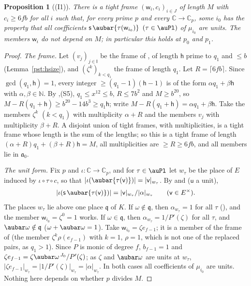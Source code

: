 \documentclass[10pt]{amsart}
\newtheorem{proposition}[theorem]{Proposition}
\theoremstyle{definition}
\theoremstyle{remark}
\newcommand{\C}{\mathbb C}
\newcommand{\N}{\mathbb N}
\begin{document}
\begin{proposition}[(I1)]\label{pst:I1}
There is a tight frame $(\mathsf w_i,c_i)_{i\in J}$ of length $M$ with $c_i\ge6fb$ for all $i$ such
that, for every prime $p$ and every $\C\to\C_p$, some $i_0$ has the property that all coefficients
$\mathsf s\,\aubar{\tau(\mathsf w_{i_0})}$ $(\tau\in\auPl)$ of $\mu_{i_0}$ are units. The members
$\mathsf w_i$ do not depend on $M$; in particular this holds at $p_0$ and $p_1$.
\end{proposition}
\begin{proof}
\emph{The frame.} Let $(v_j)_{j\in\mathsf I}$ be the frame of {\cite[Lemma~7.11]{P49}}, of length
$\mathsf h$ prime to $q_1$ and $\le b$ (Lemma~\ref{pst:hsize}), and $(\zeta^k)_{k<q_1}$ the frame of
length $q_1$. Let $R=\lceil6fb\rceil$. Since $\gcd(q_1,\mathsf h)=1$, every integer
$\ge(q_1-1)(\mathsf h-1)$ is of the form $\alpha q_1+\beta\mathsf h$ with $\alpha,\beta\in\N$.
By {\cite[Lemma~13.4(S3)]{P46}},(S5), $q_1\le x^{12}\le b$, $R\le7b^2$ and $M\ge b^{20}$, so
$M-R(q_1+\mathsf h)\ge b^{20}-14b^3\ge q_1\mathsf h$; write $M-R(q_1+\mathsf h)=\alpha q_1+\beta
\mathsf h$. Take the members $\zeta^k$ $(k<q_1)$ with multiplicity $\alpha+R$ and the members $v_j$
with multiplicity $\beta+R$. A disjoint union of tight frames, with multiplicities, is a tight frame
whose length is the sum of the lengths; so this is a tight frame of length $(\alpha+R)q_1+(\beta+R)
\mathsf h=M$, all multiplicities are $\ge R\ge6fb$, and all members lie in $\mathfrak a_0$.

\emph{The unit form.} Fix $p$ and $\iota\colon\C\to\C_p$, and for $\tau\in\auPl$ let $w_\tau$ be
the place of $E$ induced by $\iota\circ\tau\circ c$, so that $|\iota(\aubar{\tau(\mathsf v)})|=|\mathsf
v|_{w_\tau}$. By {\cite[Lemma~7.12]{P49}} and {\cite[Corollary~7.3]{P49}} ($\mathsf u$ a unit),
\[
|\iota(\mathsf s\,\aubar{\tau(\mathsf v)})|=|\mathsf v|_{w_\tau}/|\alpha|_{w_\tau}\qquad(\mathsf v
\in E^\times).
\]
The places $w_\tau$ lie above one place $\mathfrak q$ of $K$. If $\omega\notin\mathfrak q$, then
$\alpha_{w_\tau}=1$ for all $\tau$ ({\cite[\S5.2.1]{P49}}), and the member $\mathsf w_{i_0}=\zeta^0=1$
works. If $\omega\in\mathfrak q$, then $\alpha_{w_\tau}=1/P'(\zeta)$ for all $\tau$, and
$\aubar\omega\notin\mathfrak q$ ($\omega+\aubar\omega=1$). Take $\mathsf w_{i_0}=\zeta e_{f-1}$; it is
a member of the frame of {\cite[Lemma~7.11]{P49}} (the member $\zeta^k\rho(e_{f-1})$ with $k=1$, $\rho=1$,
which is not one of the replaced pairs, as $q_1>1$). Since $P$ is monic of degree $f$, $b_{f-1}=1$
and $\zeta e_{f-1}=\zeta\aubar\omega^{\,J_0}/P'(\zeta)$; as $\zeta$ and $\aubar\omega$ are units at
$w_\tau$, $|\zeta e_{f-1}|_{w_\tau}=|1/P'(\zeta)|_{w_\tau}=|\alpha|_{w_\tau}$. In both cases all
coefficients of $\mu_{i_0}$ are units. Nothing here depends on whether $p$ divides $M$.
\end{proof}
\end{document}
